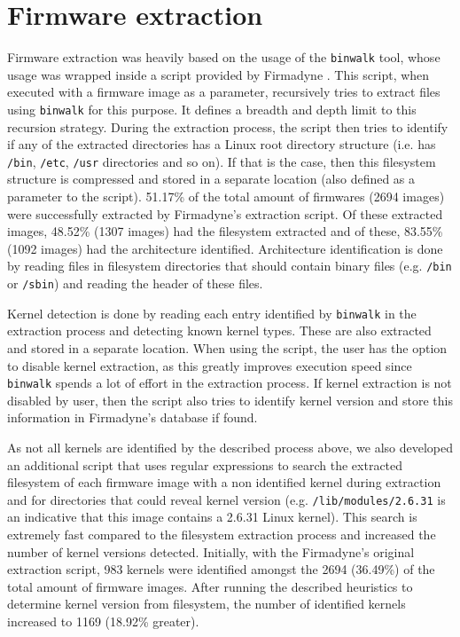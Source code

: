 \section{Firmware extraction}

Firmware extraction was heavily based on the usage of the {\tt binwalk} tool, whose usage was wrapped inside a script provided by Firmadyne \cite{firmadyne}. This script, when executed with a firmware image as a parameter, recursively tries to extract files using {\tt binwalk} for this purpose. It defines a breadth and depth limit to this recursion strategy. During the extraction process, the script then tries to identify if any of the extracted directories has a Linux root directory structure (i.e. has {\tt /bin}, {\tt /etc}, {\tt /usr} directories and so on). If that is the case, then this filesystem structure is compressed and stored in a separate location (also defined as a parameter to the script). 51.17\% of the total amount of firmwares (2694 images) were successfully extracted by Firmadyne's \cite{firmadyne} extraction script. Of these extracted images, 48.52\% (1307 images) had the filesystem extracted and of these, 83.55\% (1092 images) had the architecture identified. Architecture identification is done by reading files in filesystem directories that should contain binary files (e.g. {\tt /bin} or {\tt /sbin}) and reading the header of these files.

Kernel detection is done by reading each entry identified by {\tt binwalk} in the extraction process and detecting known kernel types. These are also extracted and stored in a separate location. When using the script, the user has the option to disable kernel extraction, as this greatly improves execution speed since {\tt binwalk} spends a lot of effort in the extraction process. If kernel extraction is not disabled by user, then the script also tries to identify kernel version and store this information in Firmadyne's \cite{firmadyne} database if found.

As not all kernels are identified by the described process above, we also developed an additional script that uses regular expressions to search the extracted filesystem of each firmware image with a non identified kernel during extraction and for directories that could reveal kernel version (e.g. {\tt /lib/modules/2.6.31} is an indicative that this image contains a 2.6.31 Linux kernel). This search is extremely fast compared to the filesystem extraction process and increased the number of kernel versions detected. Initially, with the Firmadyne's \cite{firmadyne} original extraction script, 983 kernels were identified amongst the 2694 (36.49\%) of the total amount of firmware images. After running the described heuristics to determine kernel version from filesystem, the number of identified kernels increased to 1169 (18.92\% greater).

